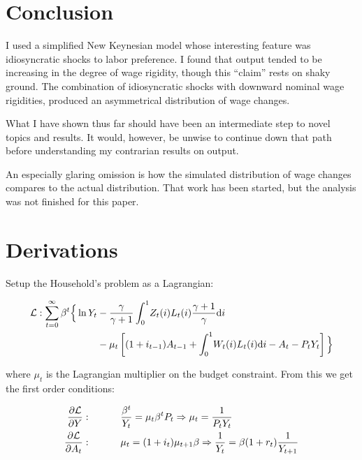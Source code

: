 \documentclass[12pt,a4paper]{scrartcl}            %
\begin{document}
\section{Conclusion}

I used a simplified New Keynesian model whose interesting feature was idiosyncratic shocks to labor preference.
I found that output tended to be increasing in the degree of wage rigidity, though this ``claim'' rests on shaky ground.
The combination of idiosyncratic shocks with downward nominal wage rigidities, produced an asymmetrical distribution of wage changes.

What I have shown thus far should have been an intermediate step to novel topics and results.
It would, however, be unwise to continue down that path before understanding my contrarian results on output.

An especially glaring omission is how the simulated distribution of wage changes compares to the actual distribution.
That work has been started, but the analysis was not finished for this paper.

\newpage



\newpage
\appendix

\section{Derivations}

Setup the Household's problem as a Lagrangian:

\begin{equation}
    \label{eqa:houehold}
    \begin{split}
        \mathcal{L} : \sum_{t=0}^{\infty} \beta^t \Big\{ \ln Y_t & - \frac{\gamma}{\gamma + 1} \int_{0}^{1} \! Z_t(i)L_t(i) \frac{\gamma + 1}{\gamma} \mathrm{d}i \\
                                                           & - \mu_t \left[ (1 + i_{t-1})A_{t-1} + \int_{0}^{1} \! W_t(i)L_t(i) \mathrm{d}i  - A_t - P_tY_t\right] \Big\}
    \end{split}
\end{equation}

where $\mu_t$ is the Lagrangian multiplier on the budget constraint.
From this we get the first order conditions:

\begin{equation}
\begin{aligned}
    \label{eqa:focs}
    \frac{\partial \Lagr}{\partial Y} & :   \ \ \ \ \ \ \ \ \  \frac{\beta^t}{Y_t} = \mu_t \beta^t P_t \Rightarrow \mu_t = \frac{1}{P_t Y_t} \\
    \frac{\partial \Lagr}{\partial A_t} & : \ \ \ \ \ \ \ \ \  \mu_t = (1 + i_t) \mu_{t + 1} \beta \Rightarrow \frac{1}{Y_t} = \beta (1 + r_t) \frac{1}{Y_{t+1}}
\end{aligned}
\end{equation}
\end{document}
